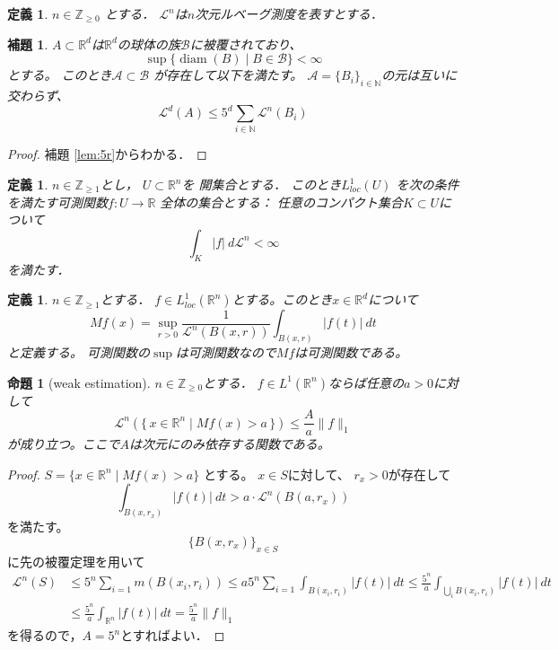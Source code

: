 \documentclass[leqno, a4paper, 12pt]{jsarticle}
\newtheorem{prop}[thm]{命題}
\newtheorem{lem}[thm]{補題}
\newtheorem{df}[thm]{定義}
\newcommand{\nn}{\mathbb{N}}
\newcommand{\zz}{\mathbb{Z}}
\newcommand{\rr}{\mathbb{R}}
\DeclareMathOperator{\di}{diam}
\begin{document}
\begin{df}
$n\in \zz_{\ge 0}$
とする．
$\mathcal{L}^{n}$は$n$次元ルベーグ測度を表すとする．
\end{df}

\begin{lem}
$A\subset \rr^d$は$\rr^d$の球体の族$\mathcal{B}$に被覆されており、
\[
\sup\{\di(B)\mid B\in \mathcal{B}\}<\infty
\]
とする。
このとき$\mathcal{A}\subset \mathcal{B}$
が存在して以下を満たす。
$\mathcal{A}=\{B_i\}_{i\in \nn}$の元は互いに交わらず、
\[
\mathcal{L}^{d}(A)\le 5^d\sum_{i\in \nn}\mathcal{L}^{n}(B_i)
\]
\end{lem}
\begin{proof}
補題 \ref{lem:5r}からわかる．
\end{proof}

\begin{df}
$n\in \zz_{\ge 1}$とし，
$U\subset \rr^{n}$を
開集合とする．
このとき$L_{loc}^{1}(U)$
を次の条件を満たす可測関数$f: U\to \rr$
全体の集合とする：
任意のコンパクト集合$K\subset U$について
\[
\int_{K}|f|\ d\mathcal{L}^{n}<\infty
\]
を満たす．
\end{df}

\begin{df}
$n\in \zz_{\ge 1}$とする．
$f\in L_{loc}^1(\rr^{n})$とする。このとき$x\in \rr^d$について
\[
Mf(x)=\sup_{r>0}\frac{1}{\mathcal{L}^{n}(B(x,r))}\int_{B(x,r)}|f(t)|\ dt
\]
と定義する。
可測関数の$\sup$は可測関数なので$Mf$は可測関数である。
\end{df}


\begin{prop}[weak estimation]
$n\in \zz_{\ge 0}$とする．
$f\in L^1(\rr^{n})$ならば任意の$a>0$に対して
\[
\mathcal{L}^{n}(\{\, 
x\in \rr^n\mid Mf(x)>a
\, \})\le \frac{A}{a}\|f\|_1
\]
が成り立つ。ここで$A$は次元にのみ依存する関数である。
\end{prop}
\begin{proof}
$S=\{x\in \rr^n\mid Mf(x)>a\}$
とする。
$x\in S$に対して、
$r_x>0$が存在して
\[
\int_{B(x,r_x)}|f(t)|\ dt> a\cdot \mathcal{L}^{n}(B(a,r_x))
\]
を満たす。
\[
\{B(x,r_x)\}_{x\in S}
\]
に先の被覆定理を用いて
\begin{align*}
\mathcal{L}^{n}(S)&\le 5^n\sum_{i=1}m(B(x_i,r_i))\le a5^n\sum_{i=1}\int_{B(x_i,r_i)}|f(t)|\ dt\le \frac{5^n}{a}\int_{\bigcup_iB(x_i,r_i)}|f(t)|\ dt\\
&\le \frac{5^n}{a}\int_{\rr^n}|f(t)|\ dt=\frac{5^n}{a}\|f\|_1
\end{align*}
を得るので，$A=5^{n}$とすればよい．
\end{proof}
\end{document}
